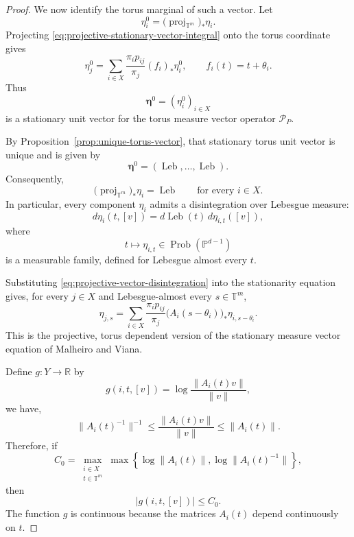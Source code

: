 \documentclass[11pt,a4paper]{amsart}
\newcommand{\T}{\mathbb T}
\newcommand{\R}{\mathbb R}
\newcommand{\PP}{\mathbb P}
\newcommand{\Leb}{\operatorname{Leb}}
\newcommand{\Prob}{\operatorname{Prob}}
\begin{document}
\begin{proof}
We now identify the torus marginal of such a vector.  Let
\[
 \eta_i^0
 =
 \bigl(\operatorname{proj}_{\T^m}\bigr)_*\eta_i.
\]
Projecting \eqref{eq:projective-stationary-vector-integral} onto the
torus coordinate gives
\[
 \eta_j^0
 =
 \sum_{i\in X}
 \frac{\pi_i p_{ij}}{\pi_j}
 (f_i)_*\eta_i^0,
 \qquad
 f_i(t)=t+\theta_i.
\]
Thus
\[
 \boldsymbol\eta^0=(\eta_i^0)_{i\in X}
\]
is a stationary unit vector for the torus measure vector operator
\(\mathcal P_P\).%

By Proposition~\ref{prop:unique-torus-vector}, that stationary torus
unit vector is unique and is given by
\[
 \boldsymbol\eta^0
 =
 (\Leb,\ldots,\Leb).
\]
Consequently,
\begin{equation}\label{eq:projective-vector-torus-marginal}
 \bigl(\operatorname{proj}_{\T^m}\bigr)_*\eta_i
 =
 \Leb
 \qquad\text{for every }i\in X.
\end{equation}
In particular, every component \(\eta_i\) admits a disintegration
over Lebesgue measure:
\begin{equation}\label{eq:projective-vector-disintegration}
 d\eta_i(t,[v])
 =
 d\Leb(t)\,d\eta_{i,t}([v]),
\end{equation}
where
\[
 t\longmapsto\eta_{i,t}\in\Prob(\PP^{d-1})
\]
is a measurable family, defined for Lebesgue almost every \(t\).

Substituting \eqref{eq:projective-vector-disintegration} into the
stationarity equation gives, for every \(j\in X\) and
Lebesgue-almost every \(s\in\T^m\),
\begin{equation}\label{eq:conditional-projective-vector-equation}
 \eta_{j,s}
 =
 \sum_{i\in X}
 \frac{\pi_i p_{ij}}{\pi_j}
 \bigl(A_i(s-\theta_i)\bigr)_*
 \eta_{i,s-\theta_i}.
\end{equation}
This is the projective, torus dependent version of the stationary
measure vector equation of Malheiro and Viana.

Define $g:Y\longrightarrow\R$ by
\begin{equation}\label{eq:projective-logarithmic-observable}
 g(i,t,[v])
 =
 \log
 \frac{\|A_i(t)v\|}{\|v\|},
\end{equation}
we have, 
\[
 \|A_i(t)^{-1}\|^{-1}
 \leq
 \frac{\|A_i(t)v\|}{\|v\|}
 \leq
 \|A_i(t)\|.
\]
Therefore, if
\[
 C_0
 =
 \max_{\substack{i\in X\\t\in\T^m}}
 \max\left\{
 \log\|A_i(t)\|,
 \log\|A_i(t)^{-1}\|
 \right\},
\]
then
\[
 |g(i,t, [v] )|\leq C_0.
\]
The function \(g\) is continuous because the matrices \(A_i(t)\)
depend continuously on \(t\).


\end{proof}
\end{document}
